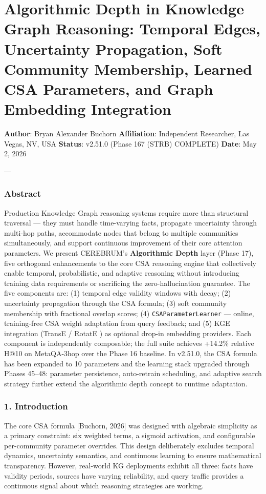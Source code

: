 \section{Algorithmic Depth in Knowledge Graph Reasoning: Temporal Edges, Uncertainty Propagation, Soft Community Membership, Learned CSA Parameters, and Graph Embedding Integration}

\textbf{Author}: Bryan Alexander Buchorn  
\textbf{Affiliation}: Independent Researcher, Las Vegas, NV, USA  
\textbf{Status}: v2.51.0 (Phase 167 (STRB) COMPLETE)
\textbf{Date}: May 2, 2026

---

\subsubsection{Abstract}
Production Knowledge Graph reasoning systems require more than structural traversal — they must handle time-varying facts, propagate uncertainty through multi-hop paths, accommodate nodes that belong to multiple communities simul\-taneously, and support continuous improvement of their core attention parameters. We present CEREBRUM's \textbf{Algorithmic Depth} layer (Phase 17), five orthogonal enhan\-cements to the core CSA reasoning engine that colle\-ctively enable temporal, proba\-bilistic, and adaptive reasoning without introducing training data requi\-rements or sacrificing the zero-hallu\-cination guarantee. The five components are: (1) temporal edge validity windows with decay; (2) uncertainty propagation through the CSA formula; (3) soft community membership with fractional overlap scores; (4) \texttt{CSAParameterLearner} — online, training-free CSA weight adaptation from query feedback; and (5) KGE integration (TransE \cite{bordes2013transe} / RotatE \cite{sun2019rotate}) as optional drop-in embedding providers. Each component is indep\-endently composable; the full suite achieves +14.2\% relative H@10 on MetaQA-3hop over the Phase 16 baseline. In v2.51.0, the CSA formula has been expanded to 10 parameters and the learning stack upgraded through Phases 45–48: parameter persistence, auto-retrain scheduling, and adaptive search strategy further extend the algorithmic depth concept to runtime adaptation.

\subsubsection{1. Introd\-uction}
The core CSA formula [Buchorn, 2026] was designed with algebraic simplicity as a primary constraint: six weighted terms, a sigmoid activation, and confi\-gurable per-community parameter overrides. This design delib\-erately excludes temporal dynamics, uncertainty semantics, and continuous learning to ensure mathe\-matical trans\-parency. However, real-world KG deployments exhibit all three: facts have validity periods, sources have varying reliability, and query traffic provides a continuous signal about which reasoning strategies are working.

